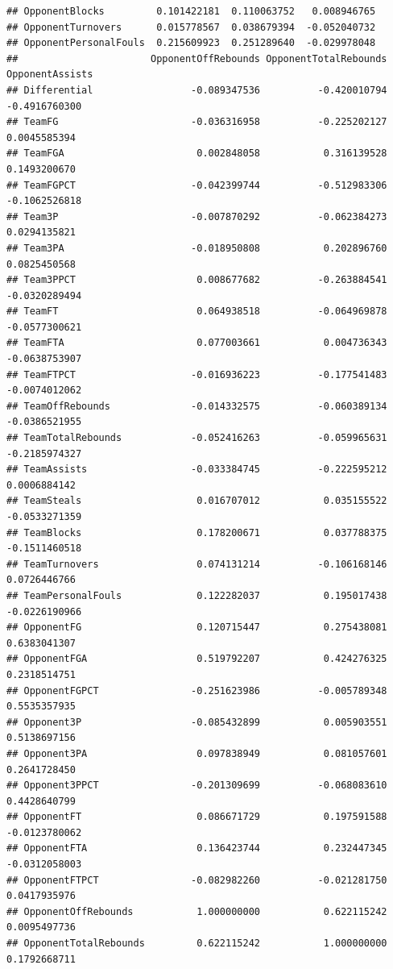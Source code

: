 \documentclass[
]{book}
\begin{document}
\begin{verbatim}
## OpponentBlocks         0.101422181  0.110063752   0.008946765
## OpponentTurnovers      0.015778567  0.038679394  -0.052040732
## OpponentPersonalFouls  0.215609923  0.251289640  -0.029978048
##                       OpponentOffRebounds OpponentTotalRebounds OpponentAssists
## Differential                 -0.089347536          -0.420010794   -0.4916760300
## TeamFG                       -0.036316958          -0.225202127    0.0045585394
## TeamFGA                       0.002848058           0.316139528    0.1493200670
## TeamFGPCT                    -0.042399744          -0.512983306   -0.1062526818
## Team3P                       -0.007870292          -0.062384273    0.0294135821
## Team3PA                      -0.018950808           0.202896760    0.0825450568
## Team3PPCT                     0.008677682          -0.263884541   -0.0320289494
## TeamFT                        0.064938518          -0.064969878   -0.0577300621
## TeamFTA                       0.077003661           0.004736343   -0.0638753907
## TeamFTPCT                    -0.016936223          -0.177541483   -0.0074012062
## TeamOffRebounds              -0.014332575          -0.060389134   -0.0386521955
## TeamTotalRebounds            -0.052416263          -0.059965631   -0.2185974327
## TeamAssists                  -0.033384745          -0.222595212    0.0006884142
## TeamSteals                    0.016707012           0.035155522   -0.0533271359
## TeamBlocks                    0.178200671           0.037788375   -0.1511460518
## TeamTurnovers                 0.074131214          -0.106168146    0.0726446766
## TeamPersonalFouls             0.122282037           0.195017438   -0.0226190966
## OpponentFG                    0.120715447           0.275438081    0.6383041307
## OpponentFGA                   0.519792207           0.424276325    0.2318514751
## OpponentFGPCT                -0.251623986          -0.005789348    0.5535357935
## Opponent3P                   -0.085432899           0.005903551    0.5138697156
## Opponent3PA                   0.097838949           0.081057601    0.2641728450
## Opponent3PPCT                -0.201309699          -0.068083610    0.4428640799
## OpponentFT                    0.086671729           0.197591588   -0.0123780062
## OpponentFTA                   0.136423744           0.232447345   -0.0312058003
## OpponentFTPCT                -0.082982260          -0.021281750    0.0417935976
## OpponentOffRebounds           1.000000000           0.622115242    0.0095497736
## OpponentTotalRebounds         0.622115242           1.000000000    0.1792668711

\end{verbatim}
\end{document}
